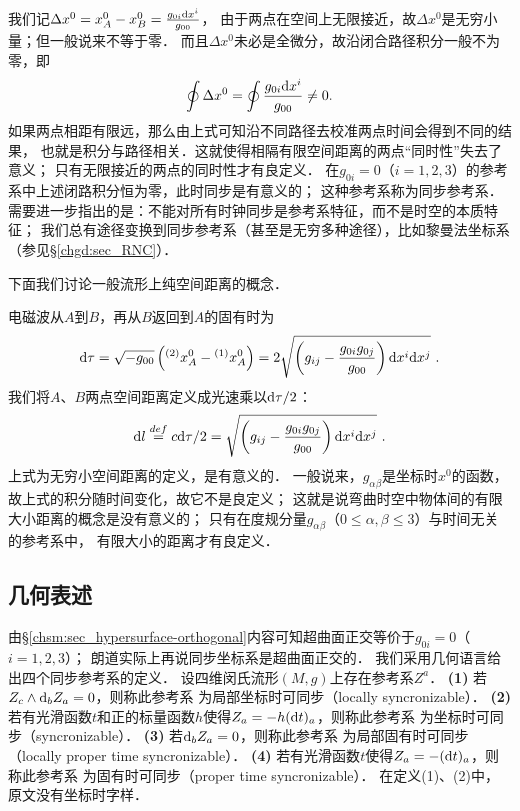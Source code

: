 我们记$\Delta x^0 = x_A^0-x_B^0=\frac{g_{0i}{\rm d}x^i}{g_{00}}$，
由于两点在空间上无限接近，故$\Delta x^0$是无穷小量；但一般说来不等于零．
而且$\Delta x^0$未必是全微分，故沿闭合路径积分一般不为零，即
\begin{equation}
    \oint \Delta x^0 = \oint \frac{g_{0i}{\rm d}x^i}{g_{00}} \neq 0 .
\end{equation}
如果两点相距有限远，那么由上式可知沿不同路径去校准两点时间会得到不同的结果，
也就是积分与路径相关．这就使得相隔有限空间距离的两点“同时性”失去了意义；
只有无限接近的两点的同时性才有良定义．
在$g_{0i}=0$（$i=1,2,3$）的参考系中上述闭路积分恒为零，此时同步是有意义的；
这种参考系称为{\heiti 同步参考系}．
需要进一步指出的是：不能对所有时钟同步是参考系特征，而不是时空的本质特征；
我们总有途径变换到同步参考系（甚至是无穷多种途径），比如黎曼法坐标系（参见\S\ref{chgd:sec_RNC}）．



下面我们讨论一般流形上纯空间距离的概念．

电磁波从$A$到$B$，再从$B$返回到$A$的固有时为
\begin{equation}
    {\rm d}\tau = \sqrt{-g_{00} }\left( {}^{(2)}x_A^0 - {}^{(1)}x_A^0 \right)
    =2 \sqrt{\left(g_{ij}- \frac{g_{0i}g_{0j}}{g_{00}}\right){\rm d}x^i {\rm d}x^j} \ .
\end{equation}
我们将$A$、$B$两点{\heiti 空间距离}定义成光速乘以${\rm d}\tau/2$：
\begin{equation}
    {\rm d}l \overset{def}{=}c {\rm d}\tau /2
    = \sqrt{\left(g_{ij}- \frac{g_{0i}g_{0j}}{g_{00}}\right){\rm d}x^i {\rm d}x^j} \ .
\end{equation}
上式为无穷小空间距离的定义，是有意义的．
一般说来，$g_{\alpha\beta}$是坐标时$x^0$的函数，故上式的积分随时间变化，故它不是良定义；
这就是说弯曲时空中物体间的有限大小距离的概念是没有意义的；
只有在度规分量$g_{\alpha\beta}$（$0\leqslant \alpha,\beta\leqslant 3$）与时间无关的参考系中，
有限大小的距离才有良定义．





\subsection{几何表述}
由\S\ref{chsm:sec_hypersurface-orthogonal}内容可知超曲面正交等价于$g_{0i}=0$（$i=1,2,3$）；
朗道实际上再说同步坐标系是超曲面正交的．
我们采用几何语言\cite[\S 2.3]{sachs-wu-1977}给出四个同步参考系的定义．
设四维闵氏流形$(M,g)$上存在参考系$Z^a$．
{\bfseries (1) }若$Z_c\wedge {\rm d}_bZ_a=0$，则称此参考系
为{\heiti 局部坐标时可同步}（locally syncronizable）．
{\bfseries (2) }若有光滑函数$t$和正的标量函数$h$使得$Z_a=-h({\rm d}t)_a$，则称此参考系
为{\heiti 坐标时可同步}（syncronizable）．
{\bfseries (3) }若${\rm d}_bZ_a=0$，则称此参考系
为{\heiti 局部固有时可同步}（locally proper time syncronizable）．
{\bfseries (4) }若有光滑函数$t$使得$Z_a=-({\rm d}t)_a$，则称此参考系
为{\heiti 固有时可同步}（proper time syncronizable）．
在定义(1)、(2)中，原文没有{\kaishu 坐标时}字样．



